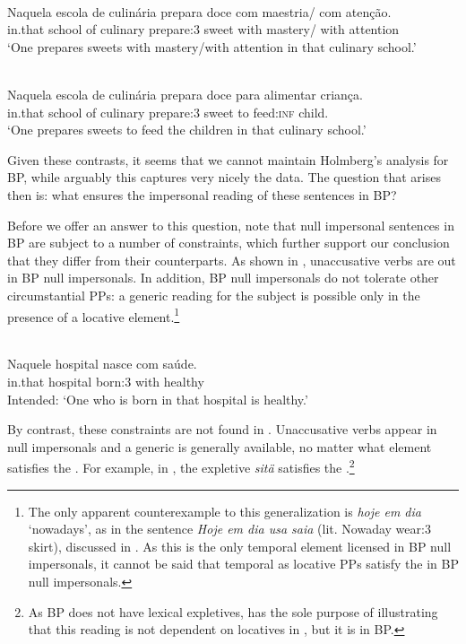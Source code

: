 \documentclass[output=paper]{LSP/langsci}
\begin{document}
\ea \label{ex:16.alexiadou}
\\
\gll {\upshape *} Naquela escola de culinária prepara doce com maestria/ com atenção.\\
     {} in.that school of culinary prepare:3 sweet with mastery/ with attention\\
\glt ‘One prepares sweets with mastery/with attention in that culinary school.’
\z


\ea\label{ex:17.alexiadou}
\\
\gll {\upshape *} Naquela escola de culinária prepara doce para alimentar criança. \\
    {} in.that school of culinary prepare:3 sweet to feed:\textsc{inf} child.\\
\glt ‘One prepares sweets to feed the children in that culinary school.’
\z

Given these contrasts, it seems that we cannot maintain Holmberg’s analysis for BP, while arguably this captures very nicely the  data. The question that arises then is: what ensures the impersonal reading of these sentences in BP?

Before we offer an answer to this question, note that null impersonal sentences in BP are subject to a number of constraints, which further support our conclusion that they differ from their  counterparts. As shown in , unaccusative verbs are out in BP null impersonals. In addition, BP null impersonals do not tolerate other circumstantial PPs: a generic reading for the subject is possible only in the presence of a locative element.\footnote{The only apparent counterexample to this generalization is \textit{hoje em dia} ‘nowadays’, as in the sentence \textit{Hoje em dia usa saia} (lit. Nowaday wear:3 skirt), discussed in \citet{Galves2001}. As this is the only temporal element licensed in BP null impersonals, it cannot be said that temporal as locative PPs satisfy the  in BP null impersonals.}


\ea\label{ex:18.alexiadou}
\\
\gll {\upshape *} Naquele hospital nasce com saúde. \\
     {} in.that hospital born:3 with healthy\\
\glt Intended: ‘One who is born in that hospital is healthy.’
\z

By contrast, these constraints are not found in . Unaccusative verbs appear in null impersonals and a generic  is generally available, no matter what element satisfies the . For example, in , the expletive \textit{sitä} satisfies the .\footnote{As BP does not have lexical expletives,  has the sole purpose of illustrating that this reading is not dependent on locatives in , but it is in BP.}
\end{document}
